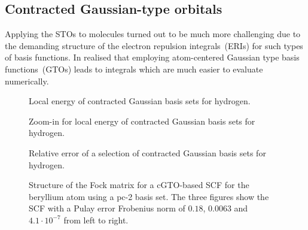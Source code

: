 \subsection{Contracted Gaussian-type orbitals}
\label{sec:cGTO}







Applying the STOs to molecules turned out to be much more
challenging due to the demanding structure of the electron repulsion integrals~(ERIs)
for such types of basis functions.
In \citeyear{Boys1950} \citeauthor{Boys1950} realised that employing
atom-centered Gaussian type basis functions~(GTOs) leads to integrals
which are much easier to evaluate numerically.







\begin{figure}
	\centering
	\caption{Local energy of contracted Gaussian basis sets for hydrogen.}
	\label{fig:LocalEnergyCgto}
\end{figure}

\begin{figure}
	\centering
	\caption{Zoom-in for local energy of contracted Gaussian basis sets for hydrogen.}
	\label{fig:LocalEnergyCgtoZoom}
\end{figure}

\begin{figure}
	\centering
	\caption{Relative error of a selection of contracted Gaussian basis sets
		for hydrogen.}
	\label{fig:LocalEnergyCgto}
\end{figure}


\begin{landscape}
\begin{figure}
	\centering
	\caption{Structure of the Fock matrix for a cGTO-based SCF
		for the beryllium atom
		using a pc-2 basis set.
		The three figures show the SCF with a Pulay error
		Frobenius norm of $0.18$, $0.0063$ and $4.1 \cdot 10^{-7}$
		from left to right.}
	\label{fig:StructureGaussianFock}
\end{figure}
\end{landscape}
